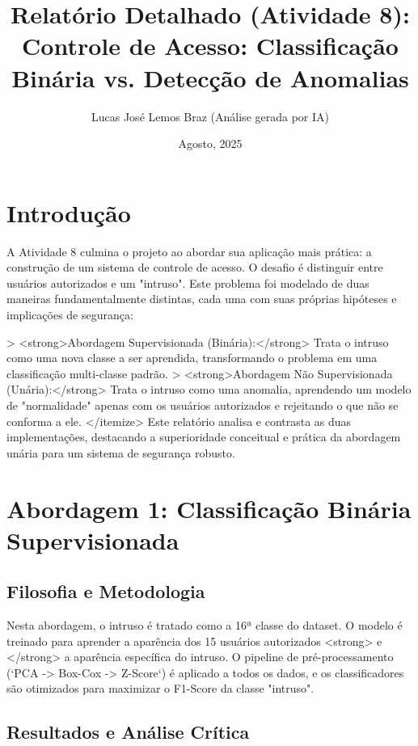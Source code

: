 \documentclass[a4paper,12pt]{article}
\title{Relatório Detalhado (Atividade 8): \\ Controle de Acesso: Classificação Binária vs. Detecção de Anomalias}
\author{Lucas José Lemos Braz (Análise gerada por IA)}
\date{Agosto, 2025}
\begin{document}
\maketitle

\section{Introdução}

A Atividade 8 culmina o projeto ao abordar sua aplicação mais prática: a construção de um sistema de controle de acesso. O desafio é distinguir entre usuários autorizados e um "intruso". Este problema foi modelado de duas maneiras fundamentalmente distintas, cada uma com suas próprias hipóteses e implicações de segurança:
\begin{itemize}
    > <strong>Abordagem Supervisionada (Binária):</strong> Trata o intruso como uma nova classe a ser aprendida, transformando o problema em uma classificação multi-classe padrão.
    > <strong>Abordagem Não Supervisionada (Unária):</strong> Trata o intruso como uma anomalia, aprendendo um modelo de "normalidade" apenas com os usuários autorizados e rejeitando o que não se conforma a ele.
</itemize>
Este relatório analisa e contrasta as duas implementações, destacando a superioridade conceitual e prática da abordagem unária para um sistema de segurança robusto.

\section{Abordagem 1: Classificação Binária Supervisionada}

\subsection{Filosofia e Metodologia}

Nesta abordagem, o intruso é tratado como a 16ª classe do dataset. O modelo é treinado para aprender a aparência dos 15 usuários autorizados <strong> e </strong> a aparência específica do intruso. O pipeline de pré-processamento (`PCA -> Box-Cox -> Z-Score`) é aplicado a todos os dados, e os classificadores são otimizados para maximizar o F1-Score da classe "intruso".

\subsection{Resultados e Análise Crítica}


\end{itemize}
\end{document}

